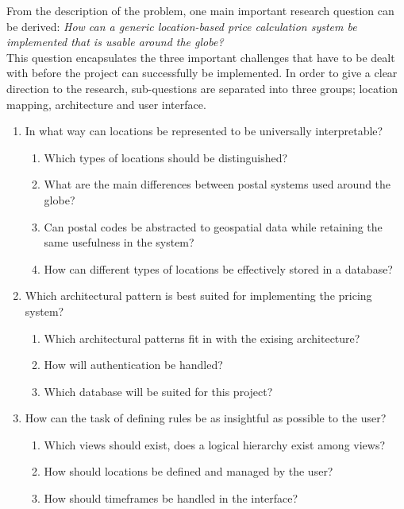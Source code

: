From the description of the problem, one main important research question can be derived: \textit{How can a generic location-based price calculation system be implemented that is usable around the globe?} \\

This question encapsulates the three important challenges that have to be dealt with before the project can successfully be implemented. In order to give a clear direction to the research, sub-questions are separated into three groups; location mapping, architecture and user interface.

\begin{enumerate}

    \item In what way can locations be represented to be universally interpretable?
    \begin{enumerate}
        \item Which types of locations should be distinguished?
        \item What are the main differences between postal systems used around the globe?
        \item Can postal codes be abstracted to geospatial data while retaining the same usefulness in the system?
        \item How can different types of locations be effectively stored in a database?
    \end{enumerate}

    \item Which architectural pattern is best suited for implementing the pricing system?
    \begin{enumerate}
        \item Which architectural patterns fit in with the exising architecture?
        \item How will authentication be handled?
        \item Which database will be suited for this project?
    \end{enumerate}

    \item How can the task of defining rules be as insightful as possible to the user?
    \begin{enumerate}
        \item Which views should exist, does a logical hierarchy exist among views?
        \item How should locations be defined and managed by the user?
        \item How should timeframes be handled in the interface?
    \end{enumerate}

\end{enumerate}

